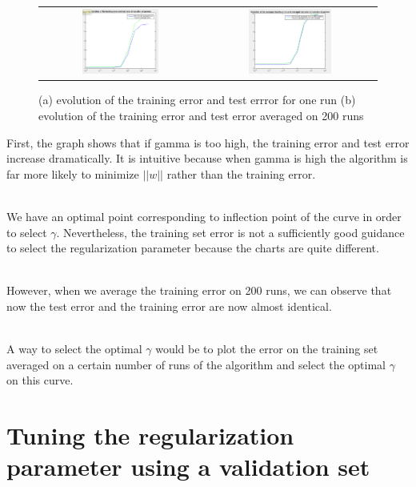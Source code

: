 \documentclass{article} %
\begin{document}
  \begin{figure}[H]
\center
\begin{tabular}{cc}
\includegraphics[width=0.5\textwidth]{error4}&\includegraphics[width=0.5\textwidth]{averagederror4}
\end{tabular}
\caption{ (a) evolution of the training error and test errror for one run (b) evolution of the training error and test error averaged on 200 runs}
\end{figure}

First, the graph shows that if gamma is too high, the training error and test error increase dramatically. It is intuitive because when gamma is high the algorithm is far more likely to minimize $||w||$  rather than the training error.


\\We have an optimal point corresponding to inflection point of the curve in order to select $\gamma$. Nevertheless, the training set error is not a sufficiently good guidance to select the regularization parameter because the charts are quite different. 

\\However, when we average the training error on 200 runs, we can observe that now the test error and the training error are now almost identical.

\\A way to select the optimal $\gamma$ would be to plot the error on the training set averaged on a certain number of runs of the algorithm and select the optimal $\gamma$ on this curve. 


\section{Tuning the regularization parameter using a validation set}
\end{document}

